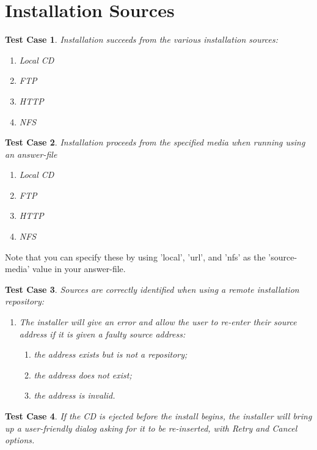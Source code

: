 \documentclass[a4paper]{article}
\newtheorem{testcase}{Test Case}
\begin{document}
\section{Installation Sources}

\begin{testcase}
Installation succeeds from the various installation sources:
\begin{enumerate}
\item Local CD
\item FTP
\item HTTP
\item NFS
\end{enumerate}
\end{testcase}

\begin{testcase}
Installation proceeds from the specified media when running using an
answer-file
\begin{enumerate}
\item Local CD
\item FTP
\item HTTP
\item NFS
\end{enumerate}
\end{testcase}
Note that you can specify these by using 'local', 'url', and 'nfs' as
the 'source-media' value in your answer-file.

\begin{testcase}
Sources are correctly identified when using a remote installation
repository:
\begin{enumerate}
\item The installer will give an error and allow the user to re-enter
  their source address if it is given a faulty source address:
  \begin{enumerate}
  \item the address exists but is not a repository;
  \item the address does not exist;
  \item the address is invalid.
  \end{enumerate}
\end{enumerate}
\end{testcase}

\begin{testcase}
If the CD is ejected before the install begins, the installer will
bring up a user-friendly dialog asking for it to be re-inserted,
with Retry and Cancel options.
\end{testcase}
\end{document}
